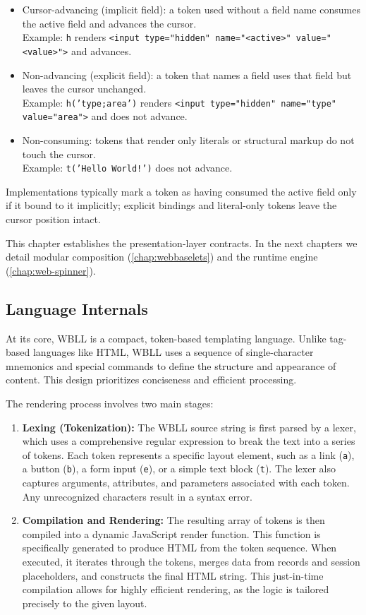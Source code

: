 \begin{itemize}
  \item Cursor-advancing (implicit field): a token used without a field name consumes the active field and advances the cursor.\\
  Example: \texttt{h} renders \texttt{<input type="hidden" name="<active>" value="<value>">} and advances.
  \item Non-advancing (explicit field): a token that names a field uses that field but leaves the cursor unchanged.\\
  Example: \texttt{h('type;area')} renders \texttt{<input type="hidden" name="type" value="area">} and does not advance.
  \item Non-consuming: tokens that render only literals or structural markup do not touch the cursor.\\
  Example: \texttt{t('Hello World!')} does not advance.
\end{itemize}

Implementations typically mark a token as having consumed the active field only if it bound to it implicitly; explicit bindings and literal-only tokens leave the cursor position intact.

This chapter establishes the presentation-layer contracts. In the next chapters we detail modular composition (\cref{chap:webbaselets}) and the runtime engine (\cref{chap:web-spinner}).

\subsection{Language Internals}

At its core, WBLL is a compact, token-based templating language. Unlike tag-based languages like HTML, WBLL uses a sequence of single-character mnemonics and special commands to define the structure and appearance of content. This design prioritizes conciseness and efficient processing.

The rendering process involves two main stages:

\begin{enumerate}
    \item \textbf{Lexing (Tokenization):} The WBLL source string is first parsed by a lexer, which uses a comprehensive regular expression to break the text into a series of tokens. Each token represents a specific layout element, such as a link (\texttt{a}), a button (\texttt{b}), a form input (\texttt{e}), or a simple text block (\texttt{t}). The lexer also captures arguments, attributes, and parameters associated with each token. Any unrecognized characters result in a syntax error.
    
    \item \textbf{Compilation and Rendering:} The resulting array of tokens is then compiled into a dynamic JavaScript render function. This function is specifically generated to produce HTML from the token sequence. When executed, it iterates through the tokens, merges data from records and session placeholders, and constructs the final HTML string. This just-in-time compilation allows for highly efficient rendering, as the logic is tailored precisely to the given layout.
\end{enumerate}


